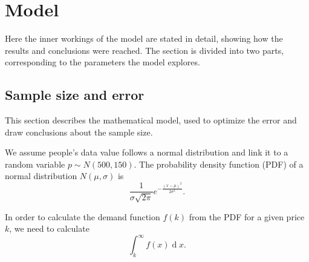 \documentclass[11pt, a4paper]{article}
\theoremstyle{definition}
\begin{document}
	\section{Model}
		Here the inner workings of the model are stated in detail, showing how the results and conclusions were reached. The section is divided into two parts, corresponding to the parameters the model explores.
		\subsection{Sample size and error}
			This section describes the mathematical model, used to optimize the error and draw conclusions about the sample size.\par
			We assume people's data value follows a normal distribution and link it to a random variable $p\sim N(500, 150)$. The probability density function (PDF) of a normal distribution $N(\mu, \sigma)$ is $$\frac{1}{\sigma\sqrt{2\pi}}e^{-\frac{(x-\mu)^{2}}{2\sigma^{2}}}.$$\par\noindent
			In order to calculate the demand function $f(k)$ from the PDF for a given price $k$, we need to calculate
			$$\int_{k}^{\infty}f(x)\operatorname{d} x.$$
\end{document}
